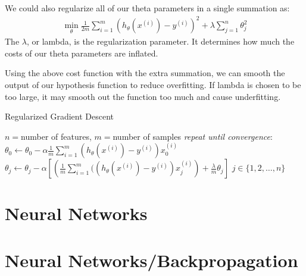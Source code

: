 \documentclass{article}
\begin{document}
            We could also regularize all of our theta parameters in a single summation as:
            \begin{align*}
                \min_{\theta}\frac{1}{2m}\sum_{i=1}^m(h_{\theta}(x^{(i)})-y^{(i)})^2 + \lambda\sum_{j=1}^{n}\theta_j^2        
            \end{align*}
            The $\lambda$, or lambda, is the regularization parameter. It determines how much the costs of our theta parameters are inflated.

            Using the above cost function with the extra summation, we can smooth the output of our hypothesis function to reduce overfitting. If lambda is chosen 
            to be too large, it may smooth out the function too much and cause underfitting.

            \begin{algorithm}
                \caption{Regularized Gradient Descent}
                \begin{algorithmic}
                    \STATE $n = $number of features, $m = $number of samples
                    \STATE \emph{repeat until convergence}:
                    \STATE \hspace{12pt}$\theta_0 \gets \theta_0 - \alpha\frac{1}{m}\sum_{i=1}^{m}(h_{\theta}(x^{(i)})-y^{(i)})x_0^{(i)}$
                    \STATE \hspace{12pt}$\theta_j \gets \theta_j - \alpha\left[\left(\frac{1}{m}\sum_{i=1}^{m}((h_{\theta}(x^{(i)})-y^{(i)})x_j^{(i)}\right) + \frac{\lambda}{m}\theta_j\right]$ \qquad $j \in \{1,2,\ldots,n\}$
                \end{algorithmic}
            \end{algorithm}    

    \section{Neural Networks}

    \section{Neural Networks/Backpropagation}
\end{document}
